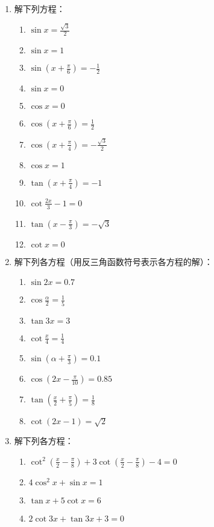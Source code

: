 \begin{enumerate}
    \item 解下列方程：
\begin{multicols}{2}
\begin{enumerate}
\item $\sin x=\frac{\sqrt{3}}{2}$
\item $\sin x=1$
\item $\sin\left(x+\frac{\pi}{6}\right)=-\frac{1}{2}$
\item $\sin x=0$
\item $\cos x=0$
\item $\cos\left(x+\frac{\pi}{6}\right)=\frac{1}{2}$
\item $\cos\left(x+\frac{\pi}{4}\right)=-\frac{\sqrt{3}}{2}$
\item $\cos x=1$
\item $\tan \left(x+\frac{\pi}{4}\right)=-1$
\item $\cot \frac{2x}{3}-1=0$
\item $\tan \left(x-\frac{\pi}{3}\right)=-\sqrt{3}$
\item $\cot x=0$
\end{enumerate}
\end{multicols}

    \item 解下列各方程（用反三角函数符号表示各方程的解）：
\begin{multicols}{2}
\begin{enumerate}
\item $\sin2x=0.7$
\item $\cos\frac{\alpha}{2}=\frac{1}{5}$
\item $\tan 3x=3$
\item $\cot \frac{x}{4}=\frac{1}{4}$
    \item $\sin\left(\alpha+\frac{\pi}{3}\right)=0.1$
    \item $\cos\left(2x-\frac{\pi}{10}\right)=0.85$
    \item $\tan \left(\frac{x}{2}+\frac{\pi}{5}\right)=\frac{1}{8}$
    \item $\cot (2x-1)=\sqrt{2}$
\end{enumerate}
\end{multicols}

\item 解下列各方程：
\begin{enumerate}
\item $\cot^{2}\left(\frac{x}{2}-\frac{\pi}{8}\right)+3 \cot\left(\frac{x}{2}-\frac{\pi}{8}\right)-4=0$
\item $4 \cos ^{2} x+\sin x=1$
\item $\tan  x+5 \cot x=6$
\item $2 \cot 3 x+\tan  3 x+3=0$
\end{enumerate}


\end{enumerate}

